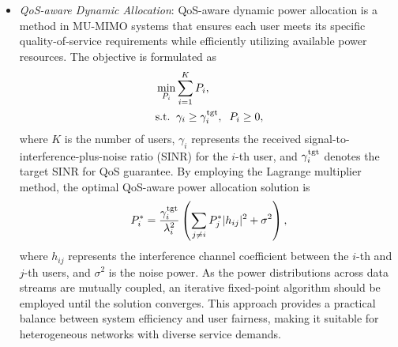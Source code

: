 \documentclass[lettersize,journal]{IEEEtran}
\begin{document}
\begin{appendices}
\begin{itemize}
\begin{equation}
 \begin{aligned}
&\mathop {\max }\limits_{{P_i}}  {\frac{D}{{\sum\nolimits_{i = 1}^D {\frac{1}{{{P_i}\lambda _i^2}}} }}} \quad \\
&\;{\rm{s}}{\rm{.t}}{\rm{.}}\quad {P_i} \ge 0,\;\;\sum\limits_{i = 1}^D {{P_i} = } {P_t}.
\end{aligned}   
\end{equation}
By leveraging the Lagrange multiplier method, the optimal harmonic-mean solution is given by
\begin{equation}
{P_i} = \beta \frac{1}{\lambda },
\end{equation}
where \( \beta\) is the factor to satisfy the total power constraint.  
\item \emph{QoS-aware Dynamic Allocation}: QoS-aware dynamic power allocation is a method in MU-MIMO systems that ensures each user meets its specific quality-of-service requirements while efficiently utilizing available power resources. The objective is formulated as
    \begin{equation}
     \begin{aligned}
&\mathop {\min }\limits_{{P_i}} \sum\limits_{i = 1}^K {{P_i}} ,\\
&{\rm{s}}{\rm{.t}}{\rm{.}}\;\;{\gamma _i} \ge \gamma _i^{\rm{tgt}},\;\;{P_i} \ge 0,
\end{aligned}   
    \end{equation}
where \( K \) is the number of users, \( \gamma_i \) represents the received signal-to-interference-plus-noise ratio (SINR) for the $i$-th user, and \( \gamma_i^{\rm{tgt}} \) denotes the target SINR for QoS guarantee. By employing the Lagrange multiplier method, the optimal QoS-aware power allocation solution is  
\begin{equation}
P_i^* = \frac{\gamma_i^{\rm{tgt}}}{\lambda_i^2} \left( \sum_{j \neq i} P_j^* |h_{ij}|^2 + \sigma^2 \right),    
\end{equation}
where \( h_{ij} \) represents the interference channel coefficient between the $i$-th and $j$-th users, and \( \sigma^2 \) is the noise power. As the power distributions across data streams are mutually coupled, an iterative fixed-point algorithm should be employed until the solution converges. This approach provides a practical balance between system efficiency and user fairness, making it suitable for heterogeneous networks with diverse service demands.
\end{itemize}




\end{appendices}
\end{document}
